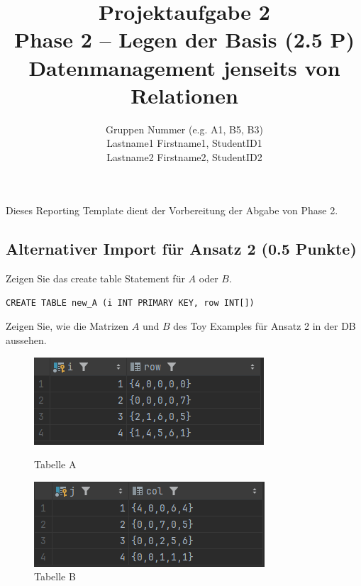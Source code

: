 \documentclass[11pt]{scrartcl}
\title{
  \textbf{\large Projektaufgabe 2 } \\
  Phase 2 – Legen der Basis (2.5 P) \\
  {\large Datenmanagement jenseits von Relationen}
}
\author{
  Gruppen Nummer (e.g. A1, B5, B3) \\
  \large Lastname1 Firstname1, StudentID1 \\
  \large Lastname2 Firstname2, StudentID2 
}
\begin{document}
\maketitle\thispagestyle{empty}

Dieses Reporting Template dient der Vorbereitung der Abgabe von Phase 2.

\subsection*{Alternativer Import für Ansatz 2 (0.5 Punkte)}

Zeigen Sie das create table Statement für $A$ oder $B$. 

\begin{lstlisting}[style=dmrsql]
  CREATE TABLE new_A (i INT PRIMARY KEY, row INT[])
\end{lstlisting}

Zeigen Sie, wie die Matrizen $A$ und $B$ des Toy Examples für Ansatz 2 in der DB aussehen.

\begin{figure}[H]
  \begin{minipage}[b]{.4\linewidth}
    \begin{center}
      \includegraphics[width=\linewidth]{Tabelle_new_A.png}
      \caption{Tabelle A}
    \end{center}
  \end{minipage}
  \hspace{.1\linewidth}
  \begin{minipage}[b]{.4\linewidth}
    \begin{center}
      \includegraphics[width=\linewidth]{Tabelle_new_B.png}
      \caption{Tabelle B}
    \end{center}
  \end{minipage}
	\label{fig:}
\end{figure}
\end{document}
